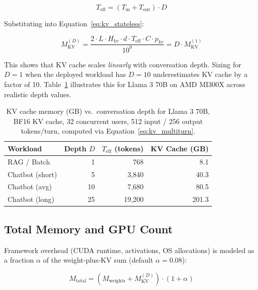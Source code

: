 \documentclass{article}
\begin{document}
\begin{equation}
  T_{\text{eff}} = (T_{\text{in}} + T_{\text{out}}) \cdot D
  \label{eq:effective_context}
\end{equation}

Substituting into Equation~\ref{eq:kv_stateless}:

\begin{equation}
  M_{\text{KV}}^{(D)} = \frac{2 \cdot L \cdot H_{kv} \cdot d \cdot
    T_{\text{eff}} \cdot C \cdot p_{kv}}{10^9}
    = D \cdot M_{\text{KV}}^{(1)}
  \label{eq:kv_multiturn}
\end{equation}

This shows that KV cache scales \emph{linearly} with conversation depth.
Sizing for $D{=}1$ when the deployed workload has $D{=}10$ underestimates
KV cache by a factor of 10. Table~\ref{tab:kvcache_depth} illustrates this
for Llama 3 70B on AMD MI300X across realistic depth values.

\begin{table}[h]
\centering
\caption{KV cache memory (GB) vs.\ conversation depth for Llama 3 70B,
  BF16 KV cache, 32 concurrent users, 512 input / 256 output tokens/turn,
  computed via Equation~\ref{eq:kv_multiturn}.}
\label{tab:kvcache_depth}
\small
\begin{tabular}{lrrr}
\toprule
Workload & Depth $D$ & $T_{\text{eff}}$ (tokens) & KV Cache (GB) \\
\midrule
RAG / Batch        & 1  &    768 &   8.1 \\
Chatbot (short)    & 5  &  3,840 &  40.3 \\
Chatbot (avg)      & 10 &  7,680 &  80.5 \\
Chatbot (long)     & 25 & 19,200 & 201.3 \\
\bottomrule
\end{tabular}
\end{table}

\subsection{Total Memory and GPU Count}
\label{sec:gpucount}

Framework overhead (CUDA runtime, activations, OS allocations) is modeled as
a fraction $\alpha$ of the weight-plus-KV sum (default $\alpha{=}0.08$):

\begin{equation}
  M_{\text{total}} = (M_{\text{weights}} + M_{\text{KV}}^{(D)}) \cdot (1 + \alpha)
  \label{eq:total_mem}
\end{equation}
\end{document}
